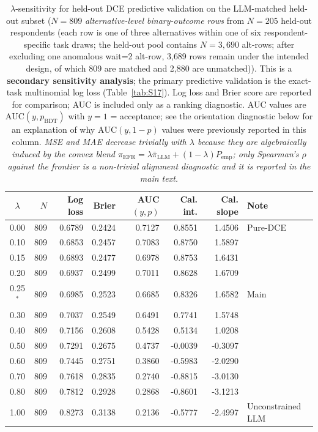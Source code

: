 \documentclass[11pt]{article}
\begin{document}
\begin{table}[htbp]
\centering
\caption{$\lambda$-sensitivity for held-out DCE predictive validation on the LLM-matched held-out subset ($N=809$ \emph{alternative-level binary-outcome rows} from $N=205$ held-out respondents (each row is one of three alternatives within one of six respondent-specific task draws; the held-out pool contains $N=3{,}690$ alt-rows; after excluding one anomalous wait=2 alt-row, 3{,}689 rows remain under the intended design, of which 809 are matched and 2{,}880 are unmatched)). This is a \textbf{secondary sensitivity analysis}; the primary predictive validation is the exact-task multinomial log loss (Table~\ref{tab:S17}). Log loss and Brier score are reported for comparison; AUC is included only as a ranking diagnostic. AUC values are $\mathrm{AUC}(y, p_\mathrm{BDT})$ with $y=1$ = acceptance; see the orientation diagnostic below for an explanation of why $\mathrm{AUC}(y, 1-p)$ values were previously reported in this column. \emph{MSE and MAE decrease trivially with $\lambda$ because they are algebraically induced by the convex blend $\pi_{\mathrm{EFR}} = \lambda \bar{\pi}_{\mathrm{LLM}} + (1-\lambda) P_{\mathrm{emp}}$; only Spearman's $\rho$ against the frontier is a non-trivial alignment diagnostic and it is reported in the main text.}}
\label{tab:S7}
\begin{tabular}{c r r r r r r l}
\toprule
$\lambda$ & $N$ & Log loss & Brier & AUC$(y,p)$ & Cal. int. & Cal. slope & Note \\
\midrule
0.00 & 809 & 0.6789 & 0.2424 & 0.7127 & 0.8551 & 1.4506 & Pure-DCE \\
0.10 & 809 & 0.6853 & 0.2457 & 0.7083 & 0.8750 & 1.5897 &  \\
0.15 & 809 & 0.6893 & 0.2477 & 0.6978 & 0.8753 & 1.6431 &  \\
0.20 & 809 & 0.6937 & 0.2499 & 0.7011 & 0.8628 & 1.6709 &  \\
0.25$^*$ & 809 & 0.6985 & 0.2523 & 0.6685 & 0.8326 & 1.6582 & Main \\
0.30 & 809 & 0.7037 & 0.2549 & 0.6491 & 0.7741 & 1.5748 &  \\
0.40 & 809 & 0.7156 & 0.2608 & 0.5428 & 0.5134 & 1.0208 &  \\
0.50 & 809 & 0.7291 & 0.2675 & 0.4737 & -0.0039 & -0.3097 &  \\
0.60 & 809 & 0.7445 & 0.2751 & 0.3860 & -0.5983 & -2.0290 &  \\
0.70 & 809 & 0.7618 & 0.2835 & 0.2740 & -0.8815 & -3.0130 &  \\
0.80 & 809 & 0.7812 & 0.2928 & 0.2868 & -0.8601 & -3.1213 &  \\
1.00 & 809 & 0.8273 & 0.3138 & 0.2136 & -0.5777 & -2.4997 & Unconstrained LLM \\
\bottomrule
\end{tabular}


\end{table}
\end{document}
